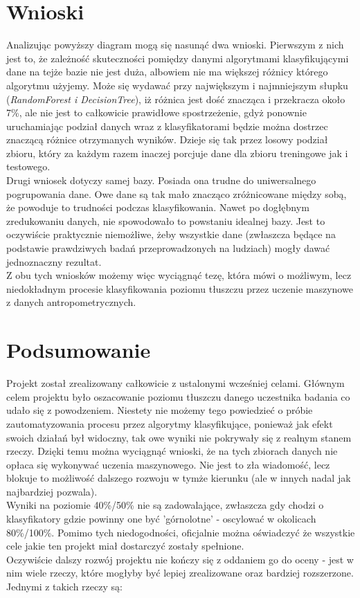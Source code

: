 \documentclass{article}
\begin{document}
	
 \newpage
 \section{Wnioski}
 
Analizując powyższy diagram mogą się nasunąć dwa wnioski. Pierwszym z nich jest to, że zależność skuteczności pomiędzy danymi algorytmami klasyfikującymi dane na tejże bazie nie jest duża, albowiem nie ma większej różnicy którego algorytmu użyjemy. Może się wydawać przy największym i najmniejszym słupku (\textit{RandomForest i DecisionTree}), iż różnica jest dość znacząca i przekracza około 7\%, ale nie jest to całkowicie prawidłowe spostrzeżenie, gdyż ponownie uruchamiając podział danych wraz z klasyfikatorami będzie można dostrzec znaczącą różnice otrzymanych wyników. Dzieje się tak przez losowy podział zbioru, który za każdym razem inaczej porcjuje dane dla zbioru treningowe jak i testowego.\\
Drugi wniosek dotyczy samej bazy. Posiada ona trudne do uniwersalnego pogrupowania dane. Owe dane są tak mało znacząco zróżnicowane między sobą, że powoduje to trudności podczas klasyfikowania. Nawet po dogłębnym zredukowaniu danych, nie spowodowało to powstaniu idealnej bazy. Jest to oczywiście praktycznie niemożliwe, żeby wszystkie dane (zwłaszcza będące na podstawie prawdziwych badań przeprowadzonych na ludziach) mogły dawać jednoznaczny rezultat.\\
Z obu tych wniosków możemy więc wyciągnąć tezę, która mówi o możliwym, lecz niedokładnym procesie klasyfikowania poziomu tłuszczu przez uczenie maszynowe z danych antropometrycznych.
 
 
 \section{Podsumowanie}
 
 Projekt został zrealizowany całkowicie z ustalonymi wcześniej celami. Głównym celem projektu było oszacowanie poziomu tłuszczu danego uczestnika badania co udało się z powodzeniem. Niestety nie możemy tego powiedzieć o próbie zautomatyzowania procesu przez algorytmy klasyfikujące, ponieważ jak efekt swoich działań był widoczny, tak owe wyniki nie pokrywały się z realnym stanem rzeczy. Dzięki temu można wyciągnąć wnioski, że na tych zbiorach danych nie opłaca się wykonywać uczenia maszynowego. Nie jest to zła wiadomość, lecz blokuje to możliwość dalszego rozwoju w tymże kierunku (ale w innych nadal jak najbardziej pozwala).\\
 Wyniki na poziomie 40\%/50\% nie są zadowalające, zwłaszcza gdy chodzi o klasyfikatory gdzie powinny one być 'górnolotne' - oscylować w okolicach 80\%/100\%. Pomimo tych niedogodności, oficjalnie można oświadczyć że wszystkie cele jakie ten projekt miał dostarczyć zostały spełnione.\\
 Oczywiście dalszy rozwój projektu nie kończy się z oddaniem go do oceny - jest w nim wiele rzeczy, które mogłyby być lepiej zrealizowane oraz bardziej rozszerzone. Jednymi z takich rzeczy są:
 
\end{document}
